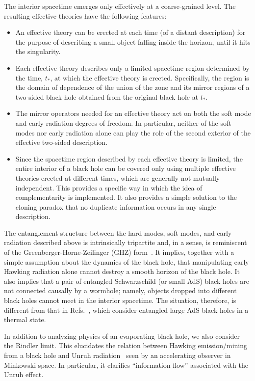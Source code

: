 \documentclass[12pt]{article}
\begin{document}
The interior spacetime emerges only effectively at a coarse-grained 
level.  The resulting effective theories have the following features:
%
\begin{itemize}
%
\item
An effective theory can be erected at each time (of a distant 
description) for the purpose of describing a small object falling 
inside the horizon, until it hits the singularity.
%
\item
Each effective theory describes only a limited spacetime region 
determined by the time, $t_*$, at which the effective theory is 
erected.  Specifically, the region is the domain of dependence of 
the union of the zone and its mirror regions of a two-sided black 
hole obtained from the original black hole at $t_*$.
%
\item
The mirror operators needed for an effective theory act on both 
the soft mode and early radiation degrees of freedom.  In particular, 
neither of the soft modes nor early radiation alone can play the 
role of the second exterior of the effective two-sided description.
%
\item
Since the spacetime region described by each effective theory is 
limited, the entire interior of a black hole can be covered only 
using multiple effective theories erected at different times, 
which are generally not mutually independent.  This provides 
a specific way in which the idea of complementarity is implemented. 
It also provides a simple solution to the cloning paradox that 
no duplicate information occurs in any single description.
%
\end{itemize}
%

The entanglement structure between the hard modes, soft modes, 
and early radiation described above is intrinsically tripartite 
and, in a sense, is reminiscent of the Greenberger-Horne-Zeilinger 
(GHZ) form~\cite{GHZ}.  It implies, together with a simple assumption 
about the dynamics of the black hole, that manipulating early 
Hawking radiation alone cannot destroy a smooth horizon of the 
black hole.  It also implies that a pair of entangled Schwarzschild 
(or small AdS) black holes are not connected causally by a wormhole; 
namely, objects dropped into different black holes cannot meet in 
the interior spacetime.  The situation, therefore, is different 
from that in Refs.~\cite{Maldacena:2001kr,Gao:2016bin}, which 
consider entangled large AdS black holes in a thermal state.

In addition to analyzing physics of an evaporating black hole, 
we also consider the Rindler limit.  This elucidates the relation 
between Hawking emission/mining~\cite{Unruh:1982ic,Brown:2012un} 
from a black hole and Unruh radiation~\cite{Unruh:1976db,%
Fulling:1972md,Davies:1974th} seen by an accelerating observer 
in Minkowski space.  In particular, it clarifies ``information 
flow'' associated with the Unruh effect.
\end{document}
